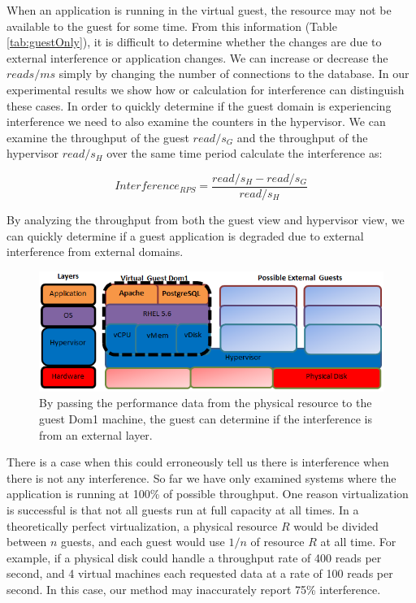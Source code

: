 When an application is running in the virtual guest, the resource may not be available to the guest for some time.  From this information (Table \ref{tab:guestOnly}), it is difficult to determine whether the changes are due to external interference or application changes. We can increase or decrease the $reads/ms$ simply by changing the number of connections to the database.  In our experimental results we show how or calculation for interference can distinguish these cases.  In order to quickly determine if the guest domain is experiencing interference we need to also examine the counters in the hypervisor.  We can examine the throughput of the guest $read/s_G$ and the throughput of the hypervisor $read/s_H$ over the same time period calculate the interference as:

\begin{equation}
	Interference_{RPS} = \frac{read/s_H - read/s_G}{read/s_H} 
\end{equation}

By analyzing the throughput from both the guest view and hypervisor view, we can quickly determine if a guest application is degraded due to external interference from external domains.  

\begin{figure}[!h]
  \begin{center}
  \includegraphics[width=6in]{images/LayersVirtualWithDisk.png}
  \caption{By passing the performance data from the physical resource to the guest Dom1 machine, the guest can determine if the interference is from an external layer.} 
  \label{LayersAndResourcesDisk}
  \end{center}
\end{figure}

There is a case when this could erroneously tell us there is interference when there is not any interference.  So far we have only examined systems where the application is running at 100\% of possible throughput.  One reason virtualization is successful is that not all guests run at full capacity at all times.  In a theoretically perfect virtualization, a physical resource $R$ would be divided between $n$ guests, and each guest would use $1/n$ of resource $R$ at all time.  For example, if a physical disk could handle a throughput rate of 400 reads per second, and 4 virtual machines each requested data at a rate of 100 reads per second. In this case, our method may inaccurately report 75\% interference.  

